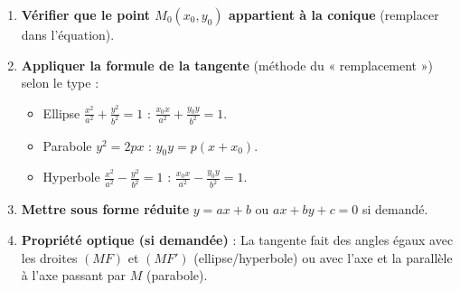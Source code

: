 \documentclass[11pt]{article}
\begin{document}
\begin{methode}
    \begin{enumerate}
        \item \textbf{Vérifier que le point $M_0(x_0,y_0)$ appartient à la conique} (remplacer dans l'équation).
        \item \textbf{Appliquer la formule de la tangente} (méthode du « remplacement ») selon le type :
        \begin{itemize}
            \item Ellipse $\frac{x^2}{a^2}+\frac{y^2}{b^2}=1$ : $\frac{x_0 x}{a^2} + \frac{y_0 y}{b^2} = 1$.
            \item Parabole $y^2 = 2px$ : $y_0 y = p(x + x_0)$.
            \item Hyperbole $\frac{x^2}{a^2}-\frac{y^2}{b^2}=1$ : $\frac{x_0 x}{a^2} - \frac{y_0 y}{b^2} = 1$.
        \end{itemize}
        \item \textbf{Mettre sous forme réduite} $y = ax + b$ ou $ax+by+c=0$ si demandé.
        \item \textbf{Propriété optique (si demandée)} : La tangente fait des angles égaux avec les droites $(MF)$ et $(MF')$ (ellipse/hyperbole) ou avec l'axe et la parallèle à l'axe passant par $M$ (parabole).
    \end{enumerate}
\end{methode}
\end{document}
